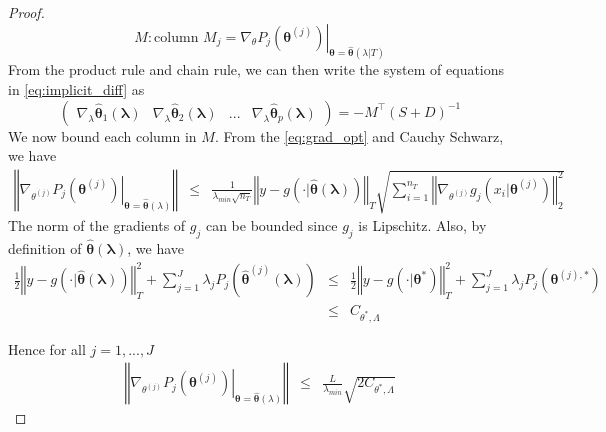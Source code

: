 \documentclass[12pt]{article}
\begin{document}
\begin{proof}
	
	\[
	M: \text{column } M_j = \left. \nabla_{\theta}P_{j}(\boldsymbol{\theta}^{(j)})
	\right|_{\boldsymbol{\theta}=\hat{\boldsymbol{\theta}}(\lambda|T)}
	\]
	From the product rule and chain rule, we can then write the system of equations in \eqref{eq:implicit_diff} as
	\begin{equation}
	\label{eq:param_matrix}
	\left(\begin{array}{cccc}
	\nabla_{\lambda}\hat{\boldsymbol{\theta}}_{1}(\boldsymbol{\lambda}) & \nabla_{\lambda}\hat{\boldsymbol{\theta}}_{2}(\boldsymbol{\lambda}) & ... & \nabla_{\lambda}\hat{\boldsymbol{\theta}}_{p}(\boldsymbol{\lambda})\end{array}\right)=-M^{\top}\left(S+D\right)^{-1}
	\end{equation}
	We now bound each column in $M$. From the \eqref{eq:grad_opt} and Cauchy Schwarz, we have 
	\begin{eqnarray*}
		\left\Vert \left.\nabla_{\theta^{(j)}}P_{j}(\boldsymbol{\theta}^{(j)})\right|_{\boldsymbol{\theta}=\hat{\boldsymbol{\theta}}(\lambda)}\right\Vert  & \le & \frac{1}{\lambda_{min}\sqrt{n_{T}}}\left\Vert y-g(\cdot|\hat{\boldsymbol{\theta}}(\boldsymbol{\lambda}))\right\Vert _{T}\sqrt{\sum_{i=1}^{n_{T}}\left\Vert \nabla_{\theta^{(j)}}g_{j}(x_{i}|\boldsymbol{\theta}^{(j)})\right\Vert _{2}^{2}}		
	\end{eqnarray*}
	The norm of the gradients of $g_j$ can be bounded since $g_j$ is Lipschitz. Also, by definition of $\hat{\boldsymbol{\theta}}(\boldsymbol{\lambda})$, we have
	\begin{eqnarray}
	\frac{1}{2}\left\Vert y-g(\cdot|\hat{\boldsymbol{\theta}}(\boldsymbol{\lambda}))\right\Vert _{T}^{2}+\sum_{j=1}^{J}\lambda_{j}P_{j}\left(\hat{\boldsymbol{\theta}}^{(j)}(\boldsymbol{\lambda})\right) & \le & \frac{1}{2}\left\Vert y-g(\cdot|\boldsymbol{\theta}^{*})\right\Vert _{T}^{2}+\sum_{j=1}^{J}\lambda_{j}P_{j}(\boldsymbol{\theta}^{(j),*})\\
	& \le & C_{\theta^{*},\Lambda}
	\end{eqnarray}
	
	Hence for all $j=1,...,J$
	\begin{eqnarray*}
		\left\Vert \left.\nabla_{\theta^{(j)}}P_{j}(\boldsymbol{\theta}^{(j)})\right|_{\boldsymbol{\theta}=\hat{\boldsymbol{\theta}}(\lambda)}\right\Vert  & \le & \frac{L}{\lambda_{min}}\sqrt{2C_{\theta^{*},\Lambda}}
	\end{eqnarray*}


\end{proof}
\end{document}
